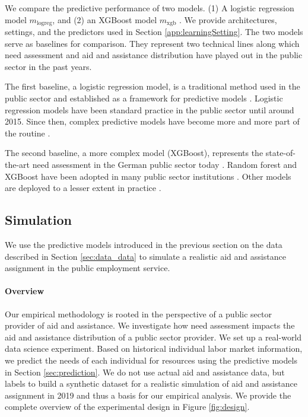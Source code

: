 We compare the predictive performance of two models. (1) A logistic regression model $m_{\mathrm{logreg}}$, and (2) an XGBoost model $m_{\mathrm{xgb}}$ \cite{chen2016}. We provide architectures, settings, and the predictors used in Section \ref{app:learningSetting}. The two models serve as baselines for comparison. They represent two technical lines along which need assessment and aid and assistance distribution have played out in the public sector in the past years.

The first baseline, a logistic regression model, is a traditional method used in the public sector and established as a framework for predictive models \cite{desireUsingArtificialIntelligence2021,desiereUsingArtificialIntelligence2021,kortner2023predictive,loxha2014profiling}. Logistic regression models have been standard practice in the public sector until around 2015. Since then, complex predictive models have become more and more part of the routine \cite{struyven2021spses}.

The second baseline, a more complex model (XGBoost), represents the state-of-the-art need assessment in the German public sector today \cite{Bach_Kern_Mautner_Kreuter_2023, sun2019mapping, wirtz2019artificial}. Random forest and XGBoost have been adopted in many public sector institutions \cite{Desiere2022,kortner2023predictive}. Other models are deployed to a lesser extent in practice \cite{Bach_Kern_Mautner_Kreuter_2023}.
\subsection{Simulation}
\label{sec:simulation}

We use the predictive models introduced in the previous section on the data described in Section \ref{sec:data_data} to simulate a realistic aid and assistance assignment in the public employment service.

\paragraph{Overview}
Our empirical methodology is rooted in the perspective of a public sector provider of aid and assistance. We investigate how need assessment impacts the aid and assistance distribution of a public sector provider. We set up a real-world data science experiment. Based on historical individual labor market information, we predict the needs of each individual for resources using the predictive models in Section \ref{sec:prediction}. We do not use actual aid and assistance data, but labels to build a synthetic dataset for a realistic simulation of aid and assistance assignment in 2019 and thus a basis for our empirical analysis. We provide the complete overview of the experimental design in Figure \ref{fig:design}. 

